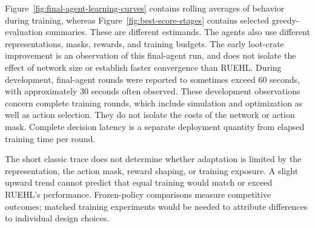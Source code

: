 \documentclass[11pt,a4paper]{article}
\begin{document}
Figure~\ref{fig:final-agent-learning-curves} contains rolling averages of behavior during training, whereas Figure~\ref{fig:best-score-stages} contains selected greedy-evaluation summaries. These are different estimands. The agents also use different representations, masks, rewards, and training budgets. The early loot-crate improvement is an observation of this final-agent run, and does not isolate the effect of network size or establish faster convergence than RUEHL.
During development, final-agent rounds were reported to sometimes exceed 60 seconds, with approximately 30 seconds often observed. These development observations concern complete training rounds, which include simulation and optimization as well as action selection. They do not isolate the costs of the network or action mask. Complete decision latency is a separate deployment quantity from elapsed training time per round.

The short classic trace does not determine whether adaptation is limited by the representation, the action mask, reward shaping, or training exposure. A slight upward trend cannot predict that equal training would match or exceed RUEHL's performance. Frozen-policy comparisons measure competitive outcomes; matched training experiments would be needed to attribute differences to individual design choices.
\end{document}
